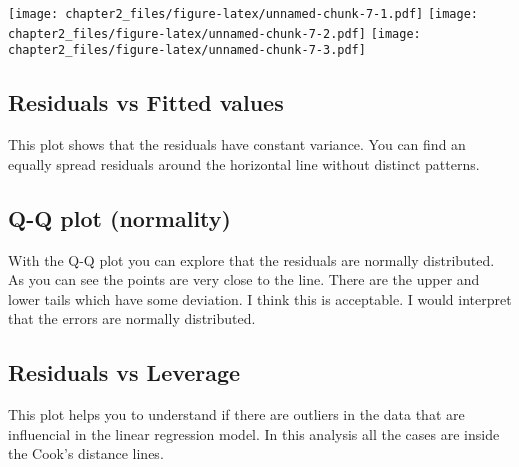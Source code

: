 \documentclass[]{article}
\begin{document}
\texttt{[image: chapter2\_files/figure-latex/unnamed-chunk-7-1.pdf]}
\texttt{[image: chapter2\_files/figure-latex/unnamed-chunk-7-2.pdf]}
\texttt{[image: chapter2\_files/figure-latex/unnamed-chunk-7-3.pdf]}

\hypertarget{residuals-vs-fitted-values}{%
\subsection{Residuals vs Fitted
values}\label{residuals-vs-fitted-values}}

This plot shows that the residuals have constant variance. You can find
an equally spread residuals around the horizontal line without distinct
patterns.

\hypertarget{q-q-plot-normality}{%
\subsection{Q-Q plot (normality)}\label{q-q-plot-normality}}

With the Q-Q plot you can explore that the residuals are normally
distributed. As you can see the points are very close to the line. There
are the upper and lower tails which have some deviation. I think this is
acceptable. I would interpret that the errors are normally distributed.

\hypertarget{residuals-vs-leverage}{%
\subsection{Residuals vs Leverage}\label{residuals-vs-leverage}}

This plot helps you to understand if there are outliers in the data that
are influencial in the linear regression model. In this analysis all the
cases are inside the Cook's distance lines.
\end{document}
